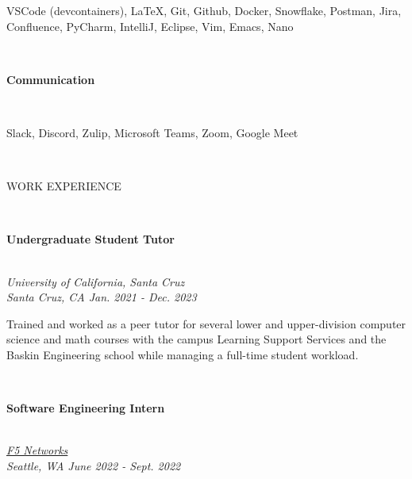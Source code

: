 \documentclass[letterpaper,10pt]{article}
\begin{document}
\begin{multicols*}{2}
\begin{minipage}{.45\textwidth}
    \begin{flushleft}
      VSCode (devcontainers), \LaTeX, Git, Github, Docker, Snowflake, Postman, Jira, Confluence, PyCharm, IntelliJ, Eclipse, Vim, Emacs, Nano
    \end{flushleft}
  \end{minipage}
  \vspace{.5em} \\
  \begin{large} \textbf{Communication} \end{large}
  \vspace{3px} \\ \indent
  \begin{minipage}{.45\textwidth}
    \begin{flushleft}
      Slack, Discord, Zulip, Microsoft Teams, Zoom, Google Meet
    \end{flushleft}
  \end{minipage}
  \columnbreak \\
  \begin{LARGE}
    \faBriefcase\hspace{5px}WORK EXPERIENCE
  \end{LARGE}
  \vspace{.5em} \\
  \begin{large} \textbf{Undergraduate Student Tutor} \end{large} \\
  \textit{University of California, Santa Cruz \\ Santa Cruz, CA \qquad Jan. 2021 - Dec. 2023}
  \vspace{5px} \\
  \begin{minipage}{.5\textwidth}
    \begin{flushleft}
      Trained and worked as a peer tutor for several lower and upper-division computer science and math courses with the campus Learning Support Services and the Baskin Engineering school while managing a full-time student workload.
    \end{flushleft}
  \end{minipage}
  \vspace{.5em} \\
  \begin{large} \textbf{Software Engineering Intern} \end{large} \\
  \textit{\href{https://www.f5.com/}{F5 Networks} \\ Seattle, WA \qquad June 2022 - Sept. 2022}

\end{multicols*}
\end{document}
